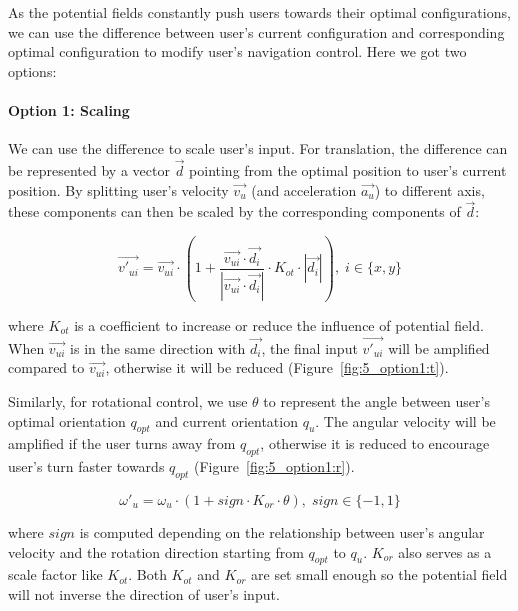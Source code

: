 As the potential fields constantly push users towards their optimal configurations, we can use the difference between user's current configuration and corresponding optimal configuration to modify user's navigation control. Here we got two options:

\paragraph{Option 1: Scaling}
We can use the difference to scale user's input. For translation, the difference can be represented by a vector $\overrightarrow{d}$ pointing from the optimal position to user's current position. By splitting user's velocity $\overrightarrow{v_{u}}$ (and acceleration $\overrightarrow{a_{u}}$) to different axis, these components can then be scaled by the corresponding components of $\overrightarrow{d}$:   

\begin{equation}
\overrightarrow{v'_{ui}}=\overrightarrow{v_{ui}} \cdot (1+\frac{\overrightarrow{v_{ui}} \cdot \overrightarrow{d_{i}}}{|\overrightarrow{v_{ui}} \cdot \overrightarrow{d_{i}}|} \cdot K_{ot} \cdot |\overrightarrow{d_{i}}|), \;i\in\{x ,y\}
\end{equation}

where $K_{ot}$ is a coefficient to increase or reduce the influence of potential field. When $\overrightarrow{v_{ui}}$ is in the same direction with $\overrightarrow{d_{i}}$, the final input $\overrightarrow{v'_{ui}}$ will be amplified compared to $\overrightarrow{v_{ui}}$, otherwise it will be reduced (Figure~\ref{fig:5_option1:t}).

Similarly, for rotational control, we use $\theta$ to represent the angle between user's optimal orientation $q_{opt}$ and current orientation $q_{u}$. The angular velocity will be amplified if the user turns away from $q_{opt}$, otherwise it is reduced to encourage user's turn faster towards $q_{opt}$ (Figure~\ref{fig:5_option1:r}).

\begin{equation}
\omega'_{u}=\omega_{u} \cdot (1+sign \cdot K_{or} \cdot \theta),\;sign \in \{-1, 1\} 
\end{equation}

where $sign$ is computed depending on the relationship between user's angular velocity and the rotation direction starting from $q_{opt}$ to $q_{u}$. $K_{or}$ also serves as a scale factor like $K_{ot}$. Both $K_{ot}$ and $K_{or}$ are set small enough so the potential field will not inverse the direction of user's input.


